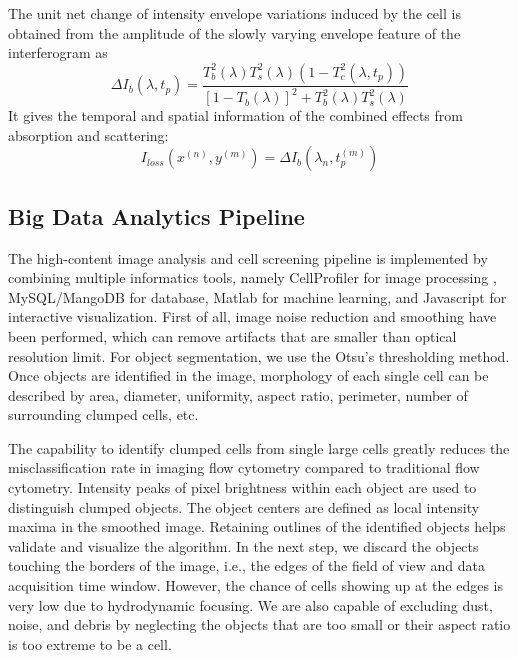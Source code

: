 \documentclass[aps,pra,reprint,longbibliography,superscriptaddress]{revtex4-1}
\begin{document}
The unit net change of intensity envelope variations induced by the cell is obtained from the amplitude of the slowly varying envelope feature of the interferogram as
\begin{equation}
\Delta I_b(\lambda, t_p) = \frac{T_b^2(\lambda) T_s^2(\lambda) (1 - T_c^2(\lambda, t_p))}{[1-T_b(\lambda)]^2 + T_b^2(\lambda) T_s^2(\lambda)}
\end{equation}
It gives the temporal and spatial information of the combined effects from absorption and scattering:
\begin{equation}
I_{loss}(x^{(n)}, y^{(m)}) = \Delta I_b(\lambda_n, t_p^{(m)})
\end{equation}

\subsection{Big Data Analytics Pipeline}

The high-content image analysis and cell screening pipeline is implemented by combining multiple informatics tools, namely CellProfiler for image processing \cite{carpenter2006cellprofiler,kamentsky2011improved}, MySQL/MangoDB for database, Matlab for machine learning, and Javascript for interactive visualization. First of all, image noise reduction and smoothing have been performed, which can remove artifacts that are smaller than optical resolution limit. For object segmentation, we use the Otsu's thresholding method. Once objects are identified in the image, morphology of each single cell can be described by area, diameter, uniformity, aspect ratio, perimeter, number of surrounding clumped cells, etc.

The capability to identify clumped cells from single large cells greatly reduces the misclassification rate in imaging flow cytometry compared to traditional flow cytometry. Intensity peaks of pixel brightness within each object are used to distinguish clumped objects. The object centers are defined as local intensity maxima in the smoothed image. Retaining outlines of the identified objects helps validate and visualize the algorithm. In the next step, we discard the objects touching the borders of the image, i.e., the edges of the field of view and data acquisition time window. However, the chance of cells showing up at the edges is very low due to hydrodynamic focusing. We are also capable of excluding dust, noise, and debris by neglecting the objects that are too small or their aspect ratio is too extreme to be a cell.
\end{document}
